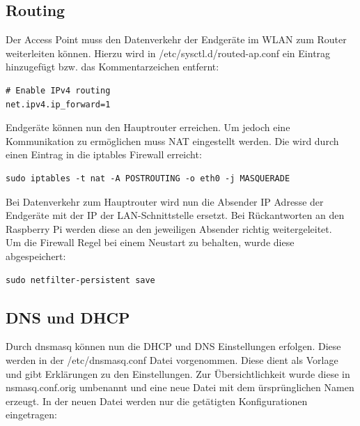 \documentclass[a4paper,11pt,singlespacing]{article}
\begin{document}
            \subsection{Routing}
                Der Access Point muss den Datenverkehr der Endgeräte im WLAN zum Router weiterleiten können.
                Hierzu wird in /etc/sysctl.d/routed-ap.conf ein Eintrag hinzugefügt bzw. das Kommentarzeichen entfernt:\\
                \lstset{
                language=bash,
                }

                \begin{lstlisting}
# Enable IPv4 routing
net.ipv4.ip_forward=1
                \end{lstlisting} 
                Endgeräte können nun den Hauptrouter erreichen. Um jedoch eine Kommunikation zu ermöglichen muss NAT eingestellt werden. Die wird durch einen Eintrag in die iptables Firewall erreicht: \\
            
                \begin{lstlisting}
sudo iptables -t nat -A POSTROUTING -o eth0 -j MASQUERADE
                \end{lstlisting} 
       
                Bei Datenverkehr zum Hauptrouter wird nun die Absender IP Adresse der Endgeräte mit der IP der LAN-Schnittstelle ersetzt. Bei Rückantworten an den Raspberry Pi werden diese an den jeweiligen Absender richtig weitergeleitet.\\
            
                Um die Firewall Regel bei einem Neustart zu behalten, wurde diese abgespeichert:\\
                
                \begin{lstlisting}
sudo netfilter-persistent save
                \end{lstlisting}    
            \subsection{DNS und DHCP}
                Durch dnsmasq können nun die DHCP und DNS Einstellungen erfolgen. Diese werden in der /etc/dnsmasq.conf Datei vorgenommen. Diese dient als Vorlage und gibt Erklärungen zu den Einstellungen. Zur Übersichtlichkeit wurde diese in nsmasq.conf.orig umbenannt und eine neue Datei mit dem ürsprünglichen Namen erzeugt. In der neuen Datei werden nur die getätigten Konfigurationen eingetragen:
            
\end{document}

